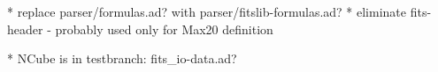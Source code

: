 

* replace parser/formulas.ad? with  parser/fitslib-formulas.ad?
* eliminate fits-header - probably used only for Max20 definition

* NCube is in testbranch: fits_io-data.ad? 

